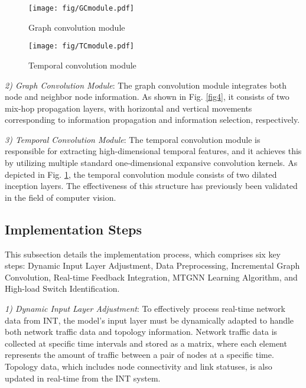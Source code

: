 \documentclass[journal]{IEEEtran}
\begin{document}
\begin{figure}[htbp] %
  \centering  
  \begin{minipage}{0.5\linewidth} %
    \centering  
    \texttt{[image: fig/GCmodule.pdf]} %
    \caption{Graph convolution module}  
    \label{fig4}  
  \end{minipage}%
  \begin{minipage}{0.5\linewidth} %
    \centering  
    \texttt{[image: fig/TCmodule.pdf]} %
    \caption{Temporal convolution module}  
    \label{fig5}  
  \end{minipage}  
\end{figure} 
\emph{2) Graph Convolution Module}: The graph convolution module integrates both node and neighbor node information. As shown in Fig. \ref{fig4}, it consists of two mix-hop propagation layers, with horizontal and vertical movements corresponding to information propagation and information selection, respectively.

\emph{3) Temporal Convolution Module}: The temporal convolution module is responsible for extracting high-dimensional temporal features, and it achieves this by utilizing multiple standard one-dimensional expansive convolution kernels.  As depicted in Fig. \ref{fig5}, the temporal convolution module consists of two dilated inception layers.  The effectiveness of this structure has previously been validated in the field of computer vision.


\subsection{Implementation Steps}

This subsection details the implementation process, which comprises six key steps: Dynamic Input Layer Adjustment, Data Preprocessing, Incremental Graph Convolution, Real-time Feedback Integration, MTGNN Learning Algorithm, and High-load Switch Identification.

\emph{1) Dynamic Input Layer Adjustment}:
To effectively process real-time network data from INT, the model's input layer must be dynamically adapted to handle both network traffic data and topology information. Network traffic data is collected at specific time intervals and stored as a matrix, where each element represents the amount of traffic between a pair of nodes at a specific time. Topology data, which includes node connectivity and link statuses, is also updated in real-time from the INT system.
\end{document}
